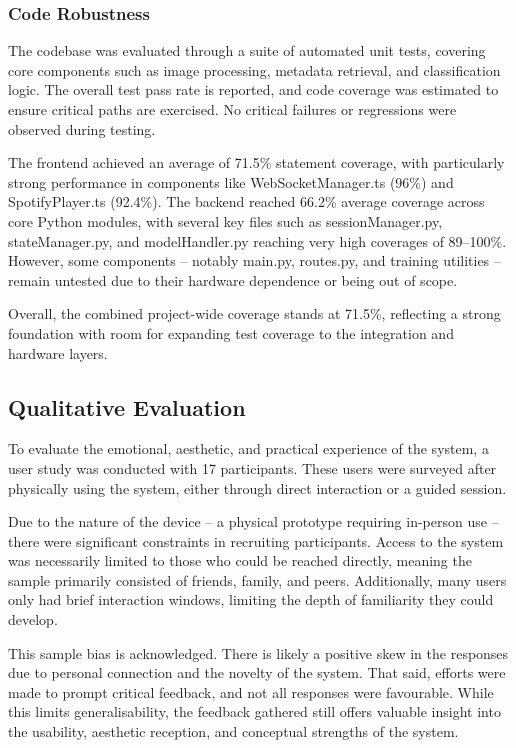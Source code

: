             \subsubsection{Code Robustness}
    
                The codebase was evaluated through a suite of automated unit tests, covering core components such as image processing, metadata retrieval, and classification logic. The overall test pass rate is reported, and code coverage was estimated to ensure critical paths are exercised. No critical failures or regressions were observed during testing.
    
                The frontend achieved an average of 71.5\% statement coverage, with particularly strong performance in components like WebSocketManager.ts (96\%) and SpotifyPlayer.ts (92.4\%). The backend reached 66.2\% average coverage across core Python modules, with several key files such as sessionManager.py, stateManager.py, and modelHandler.py reaching very high coverages of 89–100\%. However, some components -- notably main.py, routes.py, and training utilities -- remain untested due to their hardware dependence or being out of scope.
                
                Overall, the combined project-wide coverage stands at 71.5\%, reflecting a strong foundation with room for expanding test coverage to the integration and hardware layers.
    
        \subsection{Qualitative Evaluation}
    
            To evaluate the emotional, aesthetic, and practical experience of the system, a user study was conducted with 17 participants. These users were surveyed after physically using the system, either through direct interaction or a guided session.
    
            Due to the nature of the device -- a physical prototype requiring in-person use -- there were significant constraints in recruiting participants. Access to the system was necessarily limited to those who could be reached directly, meaning the sample primarily consisted of friends, family, and peers. Additionally, many users only had brief interaction windows, limiting the depth of familiarity they could develop.
            
            This sample bias is acknowledged. There is likely a positive skew in the responses due to personal connection and the novelty of the system. That said, efforts were made to prompt critical feedback, and not all responses were favourable. While this limits generalisability, the feedback gathered still offers valuable insight into the usability, aesthetic reception, and conceptual strengths of the system.
    
